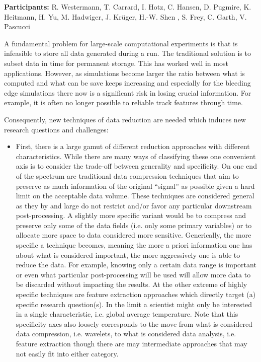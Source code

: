 \license

\begin{refsection}

\textbf{\sffamily Participants:} R. Westermann, T. Carrard, I. Hotz, C. Hansen, D. Pugmire, K. Heitmann, H. Yu, M. Hadwiger, J. Krüger, H.-W. Shen , S. Frey, C. Garth, V. Pascucci

A fundamental problem for large-scale computational experiments is that is infeasible to store all data generated during a run. The traditional solution is to subset data in time for permanent storage. This has worked well in most applications. However, as simulations become larger the ratio between what is computed and what can be save keeps increasing and especially for the bleeding edge simulations there now is a significant risk in losing crucial information. For example, it is often no longer possible to reliable track features \cite{Widanagamaachchi15} through time. 

Consequently, new techniques of data reduction are needed which induces new research questions and challenges:

\begin{itemize}
\item
First, there is a large gamut of different reduction approaches with different characteristics. While there are many ways of classifying these one convenient axis is to consider the trade-off between generality and specificity. On one end of the spectrum are traditional data compression techniques that aim to preserve as much information of the original “signal” as possible given a hard limit on the acceptable data volume. These techniques are considered general as they by and large do not restrict and/or favor any particular downstream post-processing. A slightly more specific variant would be to compress and preserve only some of the data fields (i.e. only some primary variables) or to allocate more space to data considered more sensitive. Generically, the more specific a technique becomes, meaning the more a priori information one has about what is considered important, the more aggressively one is able to reduce the data. For example, knowing only a certain data range is important or even what particular post-processing will be used will allow more data to be discarded without impacting the results. At the other extreme of highly specific techniques are feature extraction approaches which directly target (a) specific research question(s). In the limit a scientist might only be interested in a single characteristic, i.e. global average temperature. Note that this specificity axes also loosely corresponds to the move from what is considered data compression, i.e. wavelets, to what is considered data analysis, i.e. feature extraction though there are may intermediate approaches that may not easily fit into either category.


\end{itemize}
\end{refsection}
